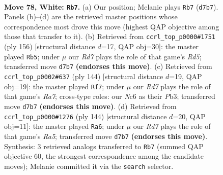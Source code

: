 \documentclass[11pt]{article}
\begin{document}
\clearpage

\begin{figure}[p]\centering
\begin{subfigure}{0.46\textwidth}\centering
\resizebox{\linewidth}{!}{%
\newchessgame
\chessboard[
  setfen={5k2/3R2p1/2N2p2/7p/3P3P/r5P1/5K2/8 w - - 49 78},
  showmover=false,
  pgfstyle=straightmove, color=movearrow, markmove={d7-b7}
]}
\caption{}
\end{subfigure}\hfill
\begin{subfigure}{0.46\textwidth}\centering
\resizebox{\linewidth}{!}{%
\newchessgame
\chessboard[
  setfen={8/8/5pk1/P2R3p/7P/2r3P1/6K1/8 w - - 5 79},
  showmover=false,
  pgfstyle=straightmove, color=movearrow, markmove={d5-b5}
]}
\caption{}
\end{subfigure}
\\[4pt]
\begin{subfigure}{0.46\textwidth}\centering
\resizebox{\linewidth}{!}{%
\newchessgame
\chessboard[
  setfen={8/R6p/1pk3p1/6P1/P6r/KP6/8/8 w - - 1 73},
  showmover=false,
  pgfstyle=straightmove, color=movearrow, markmove={a7-f7}
]}
\caption{}
\end{subfigure}\hfill
\begin{subfigure}{0.46\textwidth}\centering
\resizebox{\linewidth}{!}{%
\newchessgame
\chessboard[
  setfen={8/6k1/5p2/R4PpP/p2r2P1/7K/8/8 w - - 4 73},
  showmover=false,
  pgfstyle=straightmove, color=movearrow, markmove={a5-a6}
]}
\caption{}
\end{subfigure}
\caption{\textbf{Move 78, White: \texttt{Rb7}.} (a) Our position; Melanie plays \texttt{Rb7} (\texttt{d7b7}). Panels (b)--(d) are the retrieved master positions whose correspondence most drove this move (highest QAP objective among those that transfer to it). (b) Retrieved from \texttt{ccrl\_top\_p0000\#1751} (ply 156) [structural distance $d$=17, QAP obj=30]: the master played \texttt{Rb5}; under $\mu$ our \emph{Rd7} plays the role of that game's \emph{Rd5}; transferred move \texttt{d7b7} \textbf{(endorses this move)}. (c) Retrieved from \texttt{ccrl\_top\_p0002\#637} (ply 144) [structural distance $d$=19, QAP obj=19]: the master played \texttt{Rf7}; under $\mu$ our \emph{Rd7} plays the role of that game's \emph{Ra7}; cross-type roles: our \emph{N}c6 as their \emph{P}b3; transferred move \texttt{d7b7} \textbf{(endorses this move)}. (d) Retrieved from \texttt{ccrl\_top\_p0000\#1276} (ply 144) [structural distance $d$=20, QAP obj=11]: the master played \texttt{Ra6}; under $\mu$ our \emph{Rd7} plays the role of that game's \emph{Ra5}; transferred move \texttt{d7b7} \textbf{(endorses this move)}. Synthesis: 3 retrieved analogs transferred to \texttt{Rb7} (summed QAP objective 60, the strongest correspondence among the candidate moves); Melanie committed it via the \texttt{search} selector.}
\label{fig:thought-m154}
\end{figure}
\end{document}
